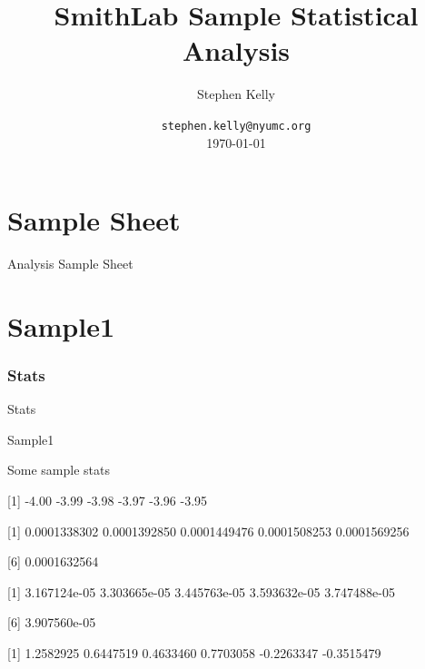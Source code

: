\documentclass[8pt]{beamer}\usepackage[]{graphicx}\usepackage[]{color}
\begin{document}
\title[Sample Statistical Analysis]{SmithLab Sample Statistical Analysis}
\author{Stephen Kelly}
\date{\texttt{stephen.kelly@nyumc.org} \\ \today}
\maketitle
\section{Sample Sheet}
\begin{frame}{ Analysis Sample Sheet}
\begin{table}[ht]
\centering
\begingroup\footnotesize
{}
\endgroup
\end{table}
\end{frame}


%
\section{Sample1}
\subsubsection{Stats}
\begin{frame}{Stats }
\small{
Sample1 

Some sample stats

[1] -4.00 -3.99 -3.98 -3.97 -3.96 -3.95

[1] 0.0001338302 0.0001392850 0.0001449476 0.0001508253 0.0001569256

[6] 0.0001632564

[1] 3.167124e-05 3.303665e-05 3.445763e-05 3.593632e-05 3.747488e-05

[6] 3.907560e-05

[1]  1.2582925  0.6447519  0.4633460  0.7703058 -0.2263347 -0.3515479
}

\end{frame}
\end{document}
